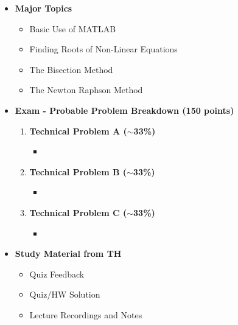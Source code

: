 \documentclass[11pt]{article}
\begin{document}
\begin{itemize}
\newpage

\item\textbf{\Large Major Topics}\\
	\begin{itemize}


		\item  {\large Basic Use of MATLAB}
		\item  {\large Finding Roots of Non-Linear Equations}
		\item  {\large The Bisection Method}
		\item  {\large The Newton Raphson Method}

	\end{itemize}


%
\item  \textbf{\Large Exam  - Probable Problem Breakdown (150 points) }\\
\Large
	\begin{enumerate}


		\item  \textbf{\Large Technical Problem A ($\sim$33\%)}\\
		\begin{itemize}
			\item 
		\end{itemize}
		\item  \textbf{\Large Technical Problem B ($\sim$33\%)}\\
		\begin{itemize}
			\item 
		\end{itemize}
		\item  \textbf{\Large Technical Problem C ($\sim$33\%)}\\
		\begin{itemize}
			\item 

		\end{itemize}

	\end{enumerate}

\item  \textbf{\Large Study Material from TH}\\
\begin{itemize}

\item Quiz Feedback 

\item Quiz/HW Solution

\item Lecture Recordings and Notes

\end{itemize}

\end{itemize}


	
\end{document}
